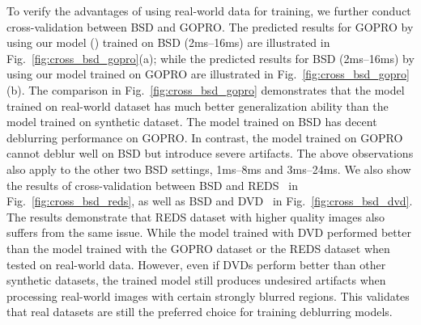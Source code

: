 \documentclass[twocolumn]{svjour3}          \smartqed  \usepackage{graphicx}
\begin{document}
\begin{figure*}[ht]
	\centering
{}
	\hfil
	\caption{Cross-validation between BSD and REDS.}
	\label{fig:cross_bsd_reds}
\end{figure*}

\begin{figure*}[ht]
	\centering
	\hfil
	\caption{Cross-validation between BSD and DVD.}
	\label{fig:cross_bsd_dvd}
\end{figure*}

To verify the advantages of using real-world data for training, we further conduct cross-validation between BSD and GOPRO. The predicted results for GOPRO by using our model () trained on BSD (2ms--16ms) are illustrated in Fig.~\ref{fig:cross_bsd_gopro}(a); while the predicted results for BSD (2ms--16ms) by using our model trained on GOPRO are illustrated in Fig.~\ref{fig:cross_bsd_gopro}(b). The comparison in Fig.~\ref{fig:cross_bsd_gopro} demonstrates that the model trained on real-world dataset has much better generalization ability than the model trained on synthetic dataset. The model trained on BSD has decent deblurring performance on GOPRO. In contrast, the model trained on GOPRO cannot deblur well on BSD but introduce severe artifacts. The above observations also apply to the other two BSD settings, 1ms--8ms and 3ms--24ms. We also show the results of cross-validation between BSD and REDS~\cite{nah2019ntire} in Fig.~\ref{fig:cross_bsd_reds}, as well as BSD and DVD~\cite{su2017deep} in Fig.~\ref{fig:cross_bsd_dvd}. The results demonstrate that REDS dataset with higher quality images also suffers from the same issue. While the model trained with DVD performed better than the model trained with the GOPRO dataset or the REDS dataset when tested on real-world data. However, even if DVDs perform better than other synthetic datasets, the trained model still produces undesired artifacts when processing real-world images with certain strongly blurred regions. This validates that real datasets are still the preferred choice for training deblurring models.
\end{document}

